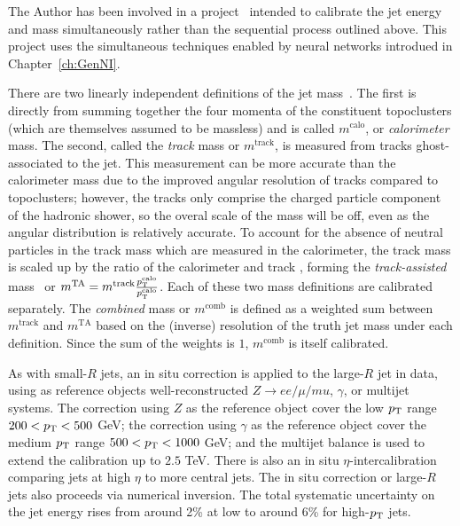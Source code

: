 The Author has been involved in a project~\cite{ATL-PHYS-PUB-2020-001} intended to calibrate the jet energy and mass simultaneously rather than the sequential process outlined above.
This project uses the simultaneous techniques enabled by neural networks introdued in Chapter~\ref{ch:GenNI}.

There are two linearly independent definitions of the jet mass~\cite{ATLAS-CONF-2016-035}.
The first is directly from summing together the four momenta of the constituent topoclusters (which are themselves assumed to be massless) and is called $m^\text{calo}$, or \textit{calorimeter} mass.
The second, called the \textit{track} mass or $m^\text{track}$, is measured from tracks ghost-associated to the jet.
This measurement can be more accurate than the calorimeter mass due to the improved angular resolution of tracks compared to topoclusters; however, the tracks only comprise the charged particle component of the hadronic shower, so the overal scale of the mass will be off, even as the angular distribution is relatively accurate.
To account for the absence of neutral particles in the track mass which are measured in the calorimeter, the track mass is scaled up by the ratio of the calorimeter and track \pt{}, forming the \textit{track-assisted} mass~\cite{Elder:2018mcr} or $m^\text{TA}=m^\text{track}\frac{p_{\text{T}}^\text{calo}}{p_{\text{T}}^\text{calo}}$.
Each of these two mass definitions are calibrated separately.
The \textit{combined} mass or $m^\text{comb}$ is defined as a weighted sum between $m^\text{track}$ and $m^\text{TA}$ based on the (inverse) resolution of the truth jet mass under each definition.
Since the sum of the weights is $1$, $m^\text{comb}$ is itself calibrated.

As with small-$R$ jets, an in situ correction is applied to the large-$R$ jet \pt{} in data, using as reference objects well-reconstructed $Z \rightarrow ee/\mu/mu$, $\gamma$, or multijet systems.
The correction using $Z$ as the reference object cover the low $p_{\text{T}}$ range $200 < p_{\text{T}} < 500$ GeV; the correction using $\gamma$ as the reference object cover the medium $p_{\text{T}}$ range $500 < p_{\text{T}} < 1000$ GeV; and the multijet balance is used to extend the calibration up to $2.5$ TeV.
There is also an in situ $\eta$-intercalibration comparing jets at high $\eta$ to more central jets.
The in situ correction or large-$R$ jets also proceeds via numerical inversion.
The total systematic uncertainty on the jet energy rises from around 2\% at low \pt{} to around 6\% for high-$p_{\text{T}}$ jets.

